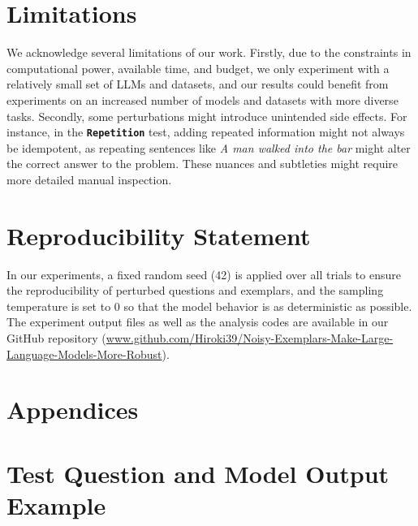 \documentclass[11pt]{article}
\begin{document}
\section*{Limitations}
We acknowledge several limitations of our work. Firstly, due to the constraints in computational power, available time, and budget, we only experiment with a relatively small set of LLMs and datasets, and our results could benefit from experiments on an increased number of models and datasets with more diverse tasks. Secondly, some perturbations might introduce unintended side effects. For instance, in the \textbf{\texttt{Repetition}} test, adding repeated information might not always be idempotent, as repeating sentences like \textit{A man walked into the bar} might alter the correct answer to the problem. These nuances and subtleties might require more detailed manual inspection.

\section*{Reproducibility Statement}
In our experiments, a fixed random seed (42) is applied over all trials to ensure the reproducibility of perturbed questions and exemplars, and the sampling temperature is set to $0$ so that the model behavior is as deterministic as possible. The experiment output files as well as the analysis codes are available in our GitHub repository (\url{www.github.com/Hiroki39/Noisy-Exemplars-Make-Large-Language-Models-More-Robust}).





\onecolumn
\appendix

\section*{Appendices}

\section{Test Question and Model Output Example}
\end{document}
